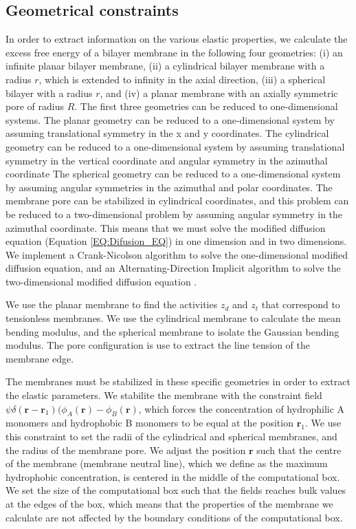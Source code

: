 \documentclass[twocolumn,aps,floatfix,nobibnotes]{revtex4-1}
\begin{document}
\subsection{Geometrical constraints}
\label{sec:geometry}

In order to extract information on the various elastic properties, we calculate the excess free energy of a bilayer membrane in the following four geometries: (i) an infinite planar bilayer membrane, (ii) a cylindrical bilayer membrane with a radius $r$, which is extended to infinity in the axial direction, (iii) a spherical bilayer with a radius $r$, and (iv) a planar membrane with an axially symmetric pore of radius $R$.
The first three geometries can be reduced to one-dimensional systems. The planar geometry can be reduced to a one-dimensional system by assuming translational symmetry in the x and y coordinates. The cylindrical geometry can be reduced to a one-dimensional system by assuming translational symmetry in the vertical coordinate and angular symmetry in the azimuthal coordinate The spherical geometry can be reduced to a one-dimensional system by assuming angular symmetries in the azimuthal and polar coordinates. The membrane pore can be stabilized in cylindrical coordinates, and this problem can be reduced to a two-dimensional problem by assuming angular symmetry in the azimuthal coordinate. This means that we must solve the modified diffusion equation (Equation \ref{EQ:Difusion_EQ}) in one dimension and in two dimensions. We implement a Crank-Nicolson algorithm to solve the one-dimensional modified diffusion equation, and an Alternating-Direction Implicit algorithm to solve the two-dimensional modified diffusion equation \cite{press2007numerical}. 

We use the planar membrane to find the activities $z_d$ and $z_t$ that correspond to tensionless membranes. We use the cylindrical membrane to calculate the mean bending modulus, and the spherical membrane to isolate the Gaussian bending modulus. The pore configuration is use to extract the line tension of the membrane edge. 

The membranes must be stabilized in these specific geometries in order to extract the elastic parameters. We stabilite the membrane with the constraint field $\psi \delta (\textbf{r} - \textbf{r}_1) (\phi_A (\textbf{r}) - \phi_B (\textbf{r})$, which forces the concentration of hydrophilic A monomers and hydrophobic B monomers to be equal at the position $\textbf{r}_1$. We use this constraint to set the radii of the cylindrical and spherical membranes, and the radius of the membrane pore. We adjust the position $\textbf{r}$ such that the centre of the membrane (membrane neutral line), which we define as the maximum hydrophobic concentration, is centered in the middle of the computational box. We set the size of the computational box such that the fields reaches bulk values at the edges of the box, which means that the properties of the membrane we calculate are not affected by the boundary conditions of the computational box. 
\end{document}
